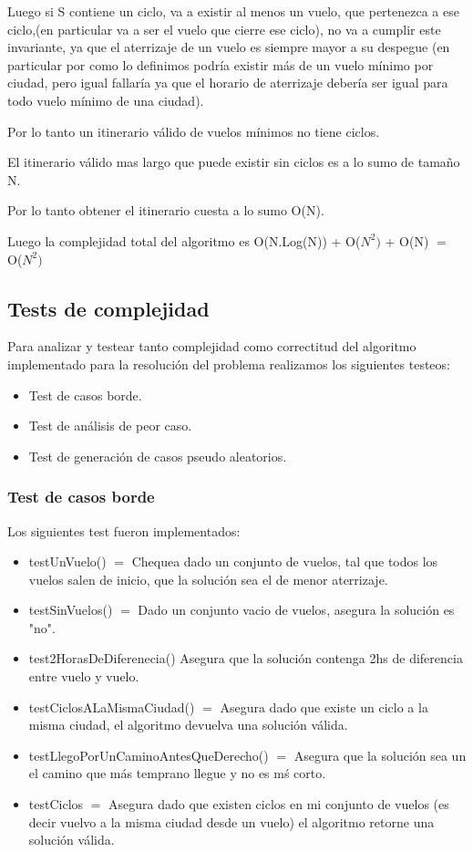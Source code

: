 Luego si S contiene un ciclo, va a existir al menos un vuelo, que pertenezca a ese ciclo,(en particular va a ser el vuelo que cierre ese ciclo), no va a cumplir este invariante, ya que el aterrizaje de un vuelo es siempre mayor a su despegue (en particular por como lo definimos podr\'ia existir m\'as de un vuelo m\'inimo por ciudad, pero igual fallar\'ia ya que el horario de aterrizaje deber\'ia ser igual para todo vuelo m\'inimo de una ciudad).

Por lo tanto un itinerario v\'alido de vuelos m\'inimos no tiene ciclos. 

El itinerario v\'alido mas largo que puede existir sin ciclos es a lo sumo de tamaño N.

Por lo tanto obtener el itinerario cuesta a lo sumo O(N).


Luego la complejidad total del algoritmo es O(N.Log(N)) + O($N^{2})$ + O(N) $=$ O($N^{2})$
\subsection{Tests de complejidad}

Para analizar y testear tanto complejidad como correctitud del algoritmo implementado para la resoluci\'on del problema  realizamos los siguientes testeos:

\begin{itemize}
  \item Test de casos borde.
  \item Test de an\'alisis de peor caso.
  \item Test de generaci\'on de casos pseudo aleatorios.
\end{itemize}

\subsubsection{Test de casos borde}


Los siguientes test fueron implementados:

\begin{itemize}
  \item testUnVuelo() $=$ Chequea dado un conjunto de vuelos, tal que todos los vuelos salen de inicio, que la soluci\'on sea el de menor aterrizaje.
  \item 	testSinVuelos() $=$ Dado un conjunto vacio de vuelos, asegura la soluci\'on es "no".
  \item test2HorasDeDiferenecia() Asegura que la soluci\'on contenga 2hs de diferencia entre vuelo y vuelo.
  \item testCiclosALaMismaCiudad() $=$ Asegura dado que existe un ciclo a la misma ciudad, el algoritmo devuelva una soluci\'on v\'alida.
  \item testLlegoPorUnCaminoAntesQueDerecho() $=$ Asegura que la soluci\'on sea un el camino que m\'as temprano llegue y no es m\'s corto.
  \item testCiclos $=$ Asegura dado que existen ciclos en mi conjunto de vuelos (es decir vuelvo a la misma ciudad desde un vuelo) el algoritmo retorne una soluci\'on v\'alida.
\end{itemize}

